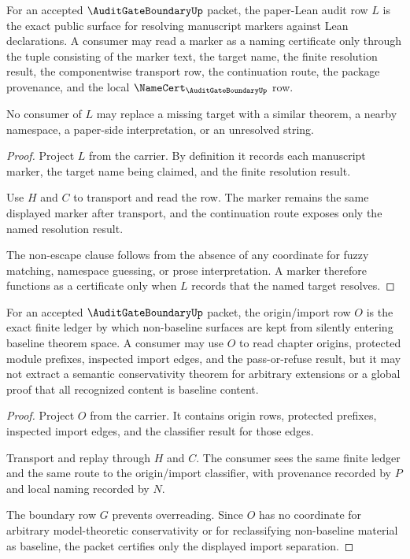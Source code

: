\begin{theorem}
\label{thm:audit-gate-boundary-paper-lean-drift-exactness}
For an accepted $\AuditGateBoundaryUp$ packet, the paper-Lean audit row $L$ is the exact public surface for resolving manuscript markers against Lean declarations. A consumer may read a marker as a naming certificate only through the tuple consisting of the marker text, the target name, the finite resolution result, the componentwise transport row, the continuation route, the package provenance, and the local $\NameCert_{\AuditGateBoundaryUp}$ row.

No consumer of $L$ may replace a missing target with a similar theorem, a nearby namespace, a paper-side interpretation, or an unresolved string.
\end{theorem}
\begin{proof}
Project $L$ from the carrier. By definition it records each manuscript marker, the target name being claimed, and the finite resolution result.

Use $H$ and $C$ to transport and read the row. The marker remains the same displayed marker after transport, and the continuation route exposes only the named resolution result.

The non-escape clause follows from the absence of any coordinate for fuzzy matching, namespace guessing, or prose interpretation. A marker therefore functions as a certificate only when $L$ records that the named target resolves.
\end{proof}

\begin{theorem}
\label{thm:audit-gate-boundary-origin-conservativity}
For an accepted $\AuditGateBoundaryUp$ packet, the origin/import row $O$ is the exact finite ledger by which non-baseline surfaces are kept from silently entering baseline theorem space. A consumer may use $O$ to read chapter origins, protected module prefixes, inspected import edges, and the pass-or-refuse result, but it may not extract a semantic conservativity theorem for arbitrary extensions or a global proof that all recognized content is baseline content.
\end{theorem}
\begin{proof}
Project $O$ from the carrier. It contains origin rows, protected prefixes, inspected import edges, and the classifier result for those edges.

Transport and replay through $H$ and $C$. The consumer sees the same finite ledger and the same route to the origin/import classifier, with provenance recorded by $P$ and local naming recorded by $N$.

The boundary row $G$ prevents overreading. Since $O$ has no coordinate for arbitrary model-theoretic conservativity or for reclassifying non-baseline material as baseline, the packet certifies only the displayed import separation.
\end{proof}

